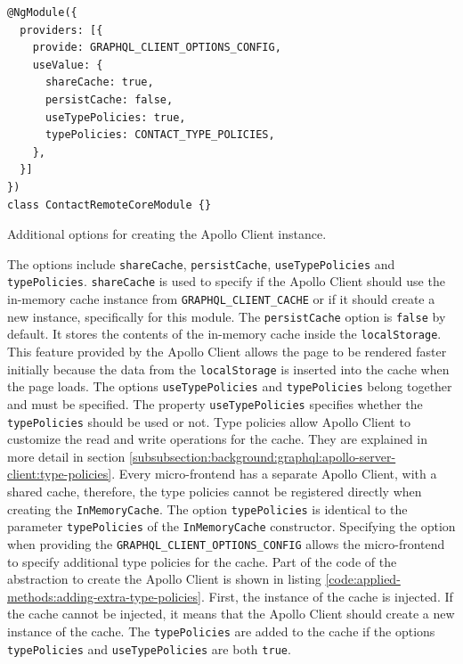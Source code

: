 \ifshowListings
\begin{listing}[H]
\begin{verbatim}
@NgModule({
  providers: [{
    provide: GRAPHQL_CLIENT_OPTIONS_CONFIG,
    useValue: {
      shareCache: true,
      persistCache: false,
      useTypePolicies: true,
      typePolicies: CONTACT_TYPE_POLICIES,
    },
  }]
})
class ContactRemoteCoreModule {}
\end{verbatim}
\caption{Additional options for creating the Apollo Client instance.}\label{code:applied-methods:graphql-client-extra-configuration-options}
\end{listing}
\fi

\noindent The options include \texttt{shareCache}, \texttt{persistCache}, \texttt{useTypePolicies} and \texttt{typePolicies}. \texttt{shareCache} is used to specify if the Apollo Client should use the in-memory cache instance from \texttt{GRAPHQL\_CLIENT\_CACHE} or if it should create a new instance, specifically for this module. The \texttt{persistCache} option is \texttt{false} by default. It stores the contents of the in-memory cache inside the \texttt{localStorage}. This feature provided by the Apollo Client allows the page to be rendered faster initially because the data from the \texttt{localStorage} is inserted into the cache when the page loads. The options \texttt{useTypePolicies} and \texttt{typePolicies} belong together and must be specified. The property \texttt{useTypePolicies} specifies whether the \texttt{typePolicies} should be used or not. Type policies allow Apollo Client to customize the read and write operations for the cache. They are explained in more detail in section \ref{subsubsection:background:graphql:apollo-server-client:type-policies}. Every micro-frontend has a separate Apollo Client, with a shared cache, therefore, the type policies cannot be registered directly when creating the \texttt{InMemoryCache}. The option \texttt{typePolicies} is identical to the parameter \texttt{typePolicies} of the \texttt{InMemoryCache} constructor. Specifying the option when providing the \texttt{GRAPHQL\_CLIENT\_OPTIONS\_CONFIG} allows the micro-frontend to specify additional type policies for the cache. Part of the code of the abstraction to create the Apollo Client is shown in listing \ref{code:applied-methods:adding-extra-type-policies}. First, the instance of the cache is injected. If the cache cannot be injected, it means that the Apollo Client should create a new instance of the cache. The \texttt{typePolicies} are added to the cache if the options \texttt{typePolicies} and \texttt{useTypePolicies} are both \texttt{true}.

